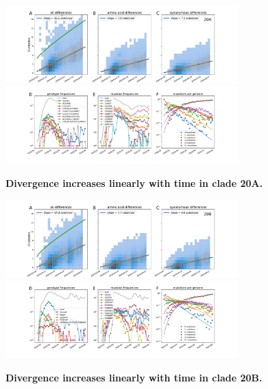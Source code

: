 \begin{figure}[h]
    \includegraphics[width=0.8\textwidth]{figures/rtt/20A_rtt.pdf}
    \includegraphics[width=0.8\textwidth]{figures/counts/20A_counts.pdf}
    \caption{{\bf Divergence increases linearly with time in clade 20A.}
    \label{fig:20A_divergence}}
\end{figure}

\begin{figure}[h]
    \includegraphics[width=0.8\textwidth]{figures/rtt/20B_rtt.pdf}
    \includegraphics[width=0.8\textwidth]{figures/counts/20B_counts.pdf}
    \caption{{\bf Divergence increases linearly with time in clade 20B.}
    \label{fig:20B_divergence}}
\end{figure}

